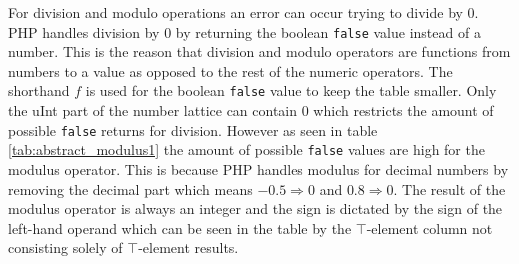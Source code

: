 For division and modulo operations an error can occur trying to divide by 0. PHP handles division by 0 by returning the boolean \texttt{false} value instead of a number. This is the reason that division and modulo operators are functions from numbers to a value as opposed to the rest of the numeric operators. The shorthand $f$ is used for the boolean \texttt{false} value to keep the table smaller. Only the uInt part of the number lattice can contain 0 which restricts the amount of possible \texttt{false} returns for division. However as seen in table \ref{tab:abstract_modulus1} the amount of possible \texttt{false} values are high for the modulus operator. This is because PHP handles modulus for decimal numbers by removing the decimal part which means $-0.5 \Rightarrow 0$ and $0.8 \Rightarrow 0$. The result of the modulus operator is always an integer and the sign is dictated by the sign of the left-hand operand which can be seen in the table by the $\top$-element column not consisting solely of $\top$-element results.

\begin{table}[htbp]
\centering
{}
\caption{Abstract Modulus}
\label{tab:abstract_modulus1}
\end{table}

